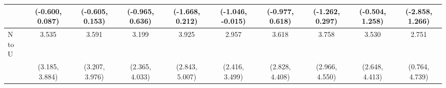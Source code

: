 {\begin{tabular}{l|c|c|c|c|c|c|c|c|c}
& {\scriptsize (-0.600, 0.087)}
& {\scriptsize (-0.605, 0.153)}
& {\scriptsize (-0.965, 0.636)}
& {\scriptsize (-1.668, 0.212)}
& {\scriptsize (-1.046, -0.015)}
& {\scriptsize (-0.977, 0.618)}
& {\scriptsize (-1.262, 0.297)}
& {\scriptsize (-0.504, 1.258)}
& {\scriptsize (-2.858, 1.266)}
\\ [0.1cm]
\hline
N to U
& 3.535 & 3.591 & 3.199 & 3.925 & 2.957 & 3.618 & 3.758 & 3.530 & 2.751 \\
& {\scriptsize (3.185, 3.884)}
& {\scriptsize (3.207, 3.976)}
& {\scriptsize (2.365, 4.033)}
& {\scriptsize (2.843, 5.007)}
& {\scriptsize (2.416, 3.499)}
& {\scriptsize (2.828, 4.408)}
& {\scriptsize (2.966, 4.550)}
& {\scriptsize (2.648, 4.413)}
& {\scriptsize (0.764, 4.739)}
\\ [0.1cm]
\hline
\hline
\end{tabular}
}
